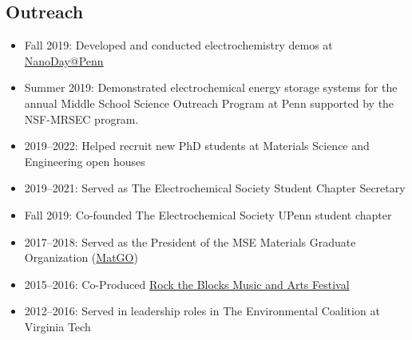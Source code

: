 \documentclass[11pt]{article} %
\begin{document}
\subsection{Outreach}
\begin{itemize}
  \item Fall 2019: Developed and conducted electrochemistry demos at \href{https://www.nano.upenn.edu/nanoday/}{NanoDay@Penn}
  \item Summer 2019: Demonstrated electrochemical energy storage systems for the annual Middle School Science Outreach Program at Penn supported by the NSF-MRSEC program.
  \item 2019--2022: Helped recruit new PhD students at Materials Science and Engineering open houses
  \item 2019--2021: Served as The Electrochemical Society Student Chapter Secretary
  \item Fall 2019: Co-founded The Electrochemical Society UPenn student chapter
  \item 2017--2018: Served as the President of the MSE Materials Graduate Organization (\href{https://mse.seas.upenn.edu/graduate-groups-resources/}{MatGO})
  \item 2015--2016: Co-Produced \href{https://www.facebook.com/rocktheblocks/}{Rock the Blocks Music and Arts Festival}
  \item 2012--2016: Served in leadership roles in The Environmental Coalition at Virginia Tech
\end{itemize}
\end{document}
